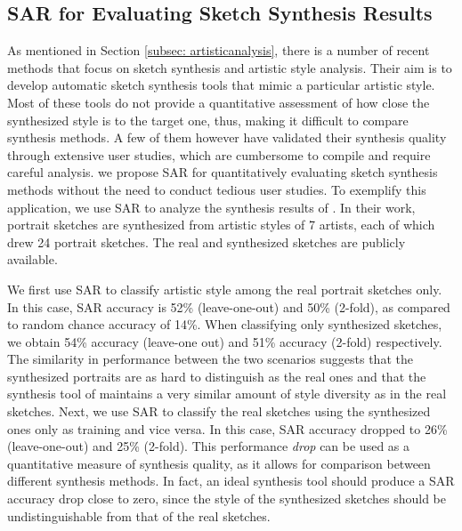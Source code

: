 \subsection{SAR for Evaluating Sketch Synthesis Results}
\vspace{-2mm}
As mentioned in Section \ref{subsec: artisticanalysis}, there is a number of recent methods that focus on sketch synthesis and artistic style analysis. Their aim is to develop automatic sketch synthesis tools that mimic a particular artistic style. Most of these tools do not provide a quantitative assessment of how close the synthesized style is to the target one, thus, making it difficult to compare synthesis methods. A few of them however have validated their synthesis quality through extensive user studies, which are cumbersome to compile and require careful analysis. we propose SAR for quantitatively evaluating sketch synthesis methods without the need to conduct tedious user studies. To exemplify this application, we use SAR to analyze the synthesis results of . In their work, portrait sketches are synthesized from artistic styles of 7 artists, each of which drew 24 portrait sketches. The real and synthesized sketches are publicly available.

We first use SAR to classify artistic style among the real portrait sketches only. In this case, SAR accuracy is 52\% (leave-one-out) and 50\% (2-fold), as compared to random chance accuracy of 14\%. When classifying only synthesized sketches, we obtain 54\% accuracy (leave-one out) and 51\% accuracy (2-fold) respectively. The  similarity in performance between the two scenarios suggests that the synthesized portraits are as hard to distinguish as the real ones and that the synthesis tool of \cite{Berger:2013:SAP:2461912.2461964} maintains a very similar amount of style diversity as in the real sketches. Next, we use SAR to classify the real sketches using the synthesized ones only as training and vice versa. In this case, SAR accuracy dropped to 26\% (leave-one-out) and 25\% (2-fold). This performance \emph{drop} can be used as a quantitative measure of synthesis quality, as it allows for comparison between different synthesis methods. In fact, an ideal synthesis tool should produce a SAR accuracy drop close to zero, since the style of the synthesized sketches should be undistinguishable from that of the real sketches.

